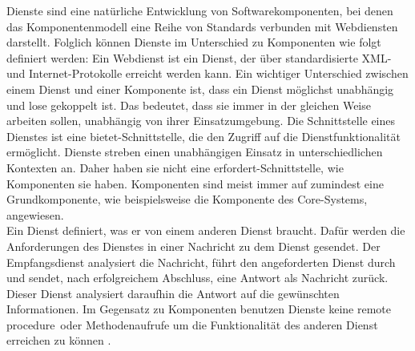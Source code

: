 Dienste sind eine natürliche Entwicklung von Softwarekomponenten, bei denen das Komponentenmodell eine Reihe von Standards verbunden mit Webdiensten darstellt. Folglich können Dienste im Unterschied zu Komponenten wie folgt definiert werden:
Ein Webdienst ist ein Dienst, der über standardisierte XML- und Internet-Protokolle erreicht werden kann. Ein wichtiger Unterschied zwischen einem Dienst und einer Komponente ist, dass ein Dienst möglichst unabhängig und lose gekoppelt ist. Das bedeutet, dass sie immer in der gleichen Weise arbeiten sollen, unabhängig von ihrer Einsatzumgebung. Die Schnittstelle eines Dienstes ist eine \glqq bietet\grqq -Schnittstelle, die den Zugriff auf die Dienstfunktionalität ermöglicht. Dienste streben einen unabhängigen Einsatz in unterschiedlichen Kontexten an. Daher haben sie nicht eine \glqq erfordert\grqq -Schnittstelle, wie Komponenten sie haben. Komponenten sind meist immer auf zumindest eine \glqq Grundkomponente\grqq , wie beispielsweise die Komponente des Core-Systems, angewiesen.\\
Ein Dienst definiert, was er von einem anderen Dienst braucht. Dafür werden die Anforderungen des Dienstes in einer Nachricht zu dem Dienst gesendet. Der Empfangsdienst analysiert die Nachricht, führt den angeforderten Dienst durch und sendet, nach erfolgreichem Abschluss, eine Antwort als Nachricht zurück. Dieser Dienst analysiert daraufhin die Antwort auf die gewünschten Informationen. Im Gegensatz zu Komponenten benutzen Dienste keine \glqq remote procedure\grqq\ oder Methodenaufrufe um die Funktionalität des anderen Dienst erreichen zu können \citereset \autocite{Sommerville.2011}.
